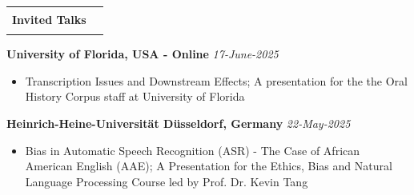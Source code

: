 \documentclass[11pt,a4paper]{article}
\makeatletter
\newcommand{\inlinesection}[1]{%
  \vspace{1em}
  \noindent
  \begin{tabular*}{\linewidth}{@{}l@{\extracolsep{\fill}}r@{}}
    \Large\textbf{\color{darkblue} #1} & \color{darkblue}\rule{0.7\linewidth}{1.2pt} \\
  \end{tabular*}
  \par\vspace{0.7em}
}
\makeatother
\begin{document}
\inlinesection{Invited Talks}
\begin{list}{}{
  \setlength{\leftmargin}{0pt}
  \setlength{\labelwidth}{0pt}
  \setlength{\itemindent}{0pt}
  \setlength{\parsep}{0pt}
  \setlength{\itemsep}{1em} %
}
\item \textcolor{RedViolet}{\textbf{University of Florida, USA - Online} \hfill \textit{17-June-2025}} \vspace{0.5em}
      \begin{itemize}
          \item Transcription Issues and Downstream Effects; A presentation for the the Oral History Corpus staff at University of Florida
      \end{itemize}
\item \textcolor{RedViolet}{\textbf{Heinrich-Heine-Universität Düsseldorf, Germany} \hfill \textit{22-May-2025}} \vspace{0.5em}
      \begin{itemize}
          \item Bias in Automatic Speech Recognition (ASR) - The Case of African American English (AAE); A Presentation for the Ethics, Bias and Natural Language Processing Course led by Prof. Dr. Kevin Tang 
      \end{itemize}
 
\end{list}
\end{document}
